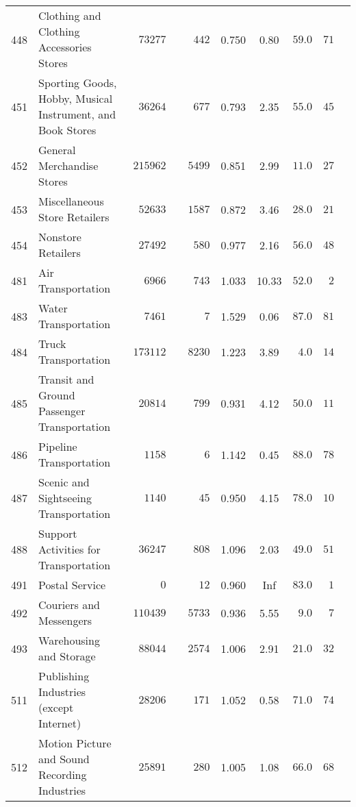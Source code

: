 \documentclass[9pt, oneside]{article}   	%
\begin{document}
\begin{longtable}{lp{3 in}ccccccc}
448  & Clothing and Clothing Accessories Stores & $\phantom{00}73277$ & $\phantom{000}442$ & 0.750 &  0.80 & $59.0$ & $71$ \\
451  & Sporting Goods, Hobby, Musical Instrument, and Book Stores & $\phantom{00}36264$ & $\phantom{000}677$ & 0.793 &  2.35 & $55.0$ & $45$ \\
452  & General Merchandise Stores & $\phantom{0}215962$ & $\phantom{00}5499$ & 0.851 &  2.99 & $11.0$ & $27$ \\
453  & Miscellaneous Store Retailers & $\phantom{00}52633$ & $\phantom{00}1587$ & 0.872 &  3.46 & $28.0$ & $21$ \\
454  & Nonstore Retailers & $\phantom{00}27492$ & $\phantom{000}580$ & 0.977 &  2.16 & $56.0$ & $48$ \\
481  & Air Transportation & $\phantom{000}6966$ & $\phantom{000}743$ & 1.033 & 10.33 & $52.0$ & $\phantom{0}2$ \\
483  & Water Transportation & $\phantom{000}7461$ & $\phantom{00000}7$ & 1.529 &  0.06 & $87.0$ & $81$ \\
484  & Truck Transportation & $\phantom{0}173112$ & $\phantom{00}8230$ & 1.223 &  3.89 & $\phantom{0}4.0$ & $14$ \\
485  & Transit and Ground Passenger Transportation & $\phantom{00}20814$ & $\phantom{000}799$ & 0.931 &  4.12 & $50.0$ & $11$ \\
486  & Pipeline Transportation & $\phantom{000}1158$ & $\phantom{00000}6$ & 1.142 &  0.45 & $88.0$ & $78$ \\
487  & Scenic and Sightseeing Transportation & $\phantom{000}1140$ & $\phantom{0000}45$ & 0.950 &  4.15 & $78.0$ & $10$ \\
488  & Support Activities for Transportation & $\phantom{00}36247$ & $\phantom{000}808$ & 1.096 &  2.03 & $49.0$ & $51$ \\
491  & Postal Service & $\phantom{000000}0$ & $\phantom{0000}12$ & 0.960 &   Inf & $83.0$ & $\phantom{0}1$ \\
492  & Couriers and Messengers & $\phantom{0}110439$ & $\phantom{00}5733$ & 0.936 &  5.55 & $\phantom{0}9.0$ & $\phantom{0}7$ \\
493  & Warehousing and Storage & $\phantom{00}88044$ & $\phantom{00}2574$ & 1.006 &  2.91 & $21.0$ & $32$ \\
511  & Publishing Industries (except Internet) & $\phantom{00}28206$ & $\phantom{000}171$ & 1.052 &  0.58 & $71.0$ & $74$ \\
512  & Motion Picture and Sound Recording Industries & $\phantom{00}25891$ & $\phantom{000}280$ & 1.005 &  1.08 & $66.0$ & $68$ \\

\end{longtable}
\end{document}
